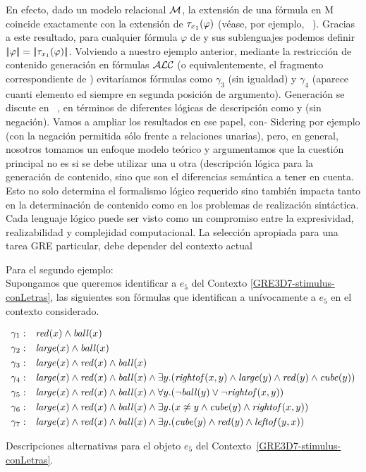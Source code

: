 En efecto, dado un modelo relacional $\mathcal{M}$, la extensi\'on de una f\'ormula \ALC en M coincide exactamente con la extensi\'on de $\mathit{\tau}_{x_1}(\varphi)$ (v\'ease, por ejemplo, ~\cite{baad:desc03}). Gracias
a este resultado, para cualquier f\'ormula $\varphi$ de \ALC y sus sublenguajes podemos definir $|\!|\varphi|\!| = |\!|\mathit{\tau}_{x_1}(\varphi)|\!|$.
 Volviendo a nuestro ejemplo anterior, mediante la restricci\'on de contenido
generaci\'on en f\'ormulas $\mathcal{ALC}$ (o equivalentemente, el fragmento correspondiente de \FOL)
evitar\'iamos f\'ormulas como
$\gamma_3$ (sin igualdad) y
$\gamma_4$ (aparece cuanti elemento ed
siempre en segunda posici\'on de argumento).
Generaci\'on se discute en ~\cite{AKS08}, en t\'erminos de diferentes l\'ogicas de descripci\'on como \ALC
y \EL (\ALC sin negaci\'on). Vamos a ampliar los resultados en ese papel, con-
Sidering por ejemplo \ELAN (\ALC con la negaci\'on permitida s\'olo frente a relaciones unarias), pero, en general, nosotros tomamos un enfoque modelo te\'orico y argumentamos que la cuesti\'on principal no es si se debe utilizar una u otra (descripci\'on l\'ogica para la generaci\'on de contenido, sino que son el diferencias sem\'antica a tener en cuenta. Esto no solo determina el formalismo l\'ogico requerido sino tambi\'en impacta tanto en la determinaci\'on de contenido como en los problemas de realizaci\'on sint\'actica. Cada
lenguaje l\'ogico puede ser visto como un compromiso entre la expresividad, realizabilidad y complejidad computacional. La selecci\'on apropiada para una tarea GRE particular, debe depender del contexto actual




Para el segundo ejemplo: \\
Supongamos que queremos identificar a $e_5$ del Contexto \ref{GRE3D7-stimulus-conLetras}, las siguientes son f\'ormulas que identifican a un\'ivocamente a $e_5$ en el contexto considerado.

\begin{table}
$$
\begin{array}{cl}
 \gamma_1: & \mathit{red}(x) \land \mathit{ball}(x)\\[3pt]
 \gamma_2: & \mathit{large}(x) \land \mathit{ball}(x)\\[3pt]
 \gamma_3: & \mathit{large}(x) \land \mathit{red}(x) \land \mathit{ball}(x)\\[3pt]
 \gamma_4: & \mathit{large}(x) \land \mathit{red}(x) \land \mathit{ball}(x) \land
   \exists y . (\mathit{rightof}(x,y) \land \mathit{large}(y) \land \mathit{red}(y) \land \mathit{cube}(y))\\[3pt]
 \gamma_5: & \mathit{large}(x) \land \mathit{red}(x) \land \mathit{ball}(x) \land
  \forall y . (\neg \mathit{ball}(y) \lor \neg \mathit{rightof}(x,y))\\[3pt]
 \gamma_6: & \mathit{large}(x) \land \mathit{red}(x) \land \mathit{ball}(x) \land
  \exists y . (x \not\approx y \land \mathit{cube}(y) \land \mathit{rightof}(x,y))\\[3pt]
 \gamma_7: & \mathit{large}(x) \land \mathit{red}(x) \land \mathit{ball}(x) \land
  \exists y . (\mathit{cube}(y) \land \mathit{red}(y) \land \mathit{leftof}(y,x))
 \end{array}
$$
\caption{Descripciones alternativas para el objeto $e_5$ del Contexto~\ref{GRE3D7-stimulus-conLetras}.}\label{tab:gammas}
\end{table}

